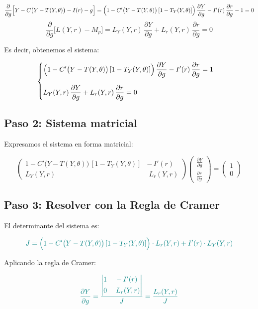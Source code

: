 \documentclass{article}
\begin{document}
\[
\frac{\partial}{\partial g}\Bigl[Y - C\bigl(Y - T(Y,\theta)\bigr) - I(r) - g\Bigr]
= \Bigl(1 - C'\bigl(Y - T(Y,\theta)\bigr)\,[1 - T_Y(Y,\theta)]\Bigr)\,\frac{\partial Y}{\partial g}
- I'(r)\,\frac{\partial r}{\partial g}
- 1
= 0
\]
\[
\frac{\partial}{\partial g}\bigl[L(Y,r) - M_p\bigr]
= L_Y(Y,r)\,\frac{\partial Y}{\partial g}
+ L_r(Y,r)\,\frac{\partial r}{\partial g}
= 0
\]

Es decir, obtenemos el sistema:

\[
\begin{cases}
\displaystyle
\Bigl(1 - C'\bigl(Y - T(Y,\theta)\bigr)\,[1 - T_Y(Y,\theta)]\Bigr)\,\dfrac{\partial Y}{\partial g}
- I'(r)\,\dfrac{\partial r}{\partial g}
= 1 \\[1.5em]
\displaystyle
L_Y(Y,r)\,\dfrac{\partial Y}{\partial g}
+ L_r(Y,r)\,\dfrac{\partial r}{\partial g}
= 0
\end{cases}
\]

\subsection*{Paso 2: Sistema matricial}

Expresamos el sistema en forma matricial:

\[
\begin{pmatrix}
1 - C'\bigl(Y - T(Y,\theta)\bigr)\,[1 - T_Y(Y,\theta)] & -\,I'(r) \\[6pt]
L_Y(Y,r)                                              & \;L_r(Y,r)
\end{pmatrix}
\begin{pmatrix}
\displaystyle \frac{\partial Y}{\partial g} \\[4pt]
\displaystyle \frac{\partial r}{\partial g}
\end{pmatrix}
=
\begin{pmatrix}
1 \\[4pt]
0
\end{pmatrix}
\]

\subsection*{Paso 3: Resolver con la Regla de Cramer}

El determinante del sistema es:

\[
\color{teal}
J = \Bigl(1 - C'\bigl(Y - T(Y,\theta)\bigr)\,[1 - T_Y(Y,\theta)]\Bigr) \cdot L_r(Y,r)
+ I'(r) \cdot L_Y(Y,r)
\]

Aplicando la regla de Cramer:

\[
\color{teal}
\frac{\partial Y}{\partial g}
= \frac{
\begin{vmatrix}
1 & -\,I'(r) \\[4pt]
0 & \;L_r(Y,r)
\end{vmatrix}
}{J}
= \frac{L_r(Y,r)}{J}
\]
\end{document}
